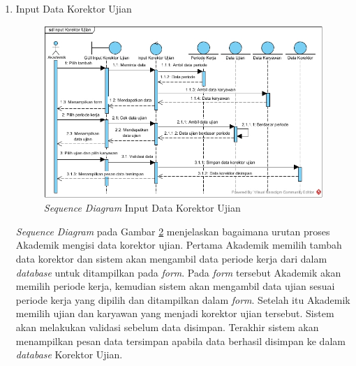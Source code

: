 \begin{enumerate}
\begin{enumerate}[label=\alph*.]
\begin{figure}[H]
            		    \caption{\emph{Sequence Diagram} Input Data Pengawas Ujian}
            		    \label{sequence_input_pengawas}
            		\end{figure}
            		\emph{Sequence Diagram} pada Gambar \ref{sequence_input_pengawas} menjelaskan bagaimana urutan proses Akademik mengisi data pengawas ujian. Pertama Akademik memilih tambah data pengawas dan sistem akan mengambil data periode kerja dari dalam \emph{database} untuk ditampilkan pada \emph{form}. Pada \emph{form} tersebut Akademik akan memilih periode kerja, kemudian sistem akan mengambil data ujian sesuai periode kerja yang dipilih dan ditampilkan dalam \emph{form}. Setelah itu Akademik memilih ujian dan karyawan yang menjadi pengawas ujian tersebut. Sistem akan melakukan validasi sebelum data disimpan. Terakhir sistem akan menampilkan pesan data tersimpan apabila data berhasil disimpan ke dalam \emph{database} Pengawas Ujian. \newpage
            	    \item Input Data Korektor Ujian
            	    \begin{figure}[H]
            		    \centering
            		    \includegraphics[width=14cm]{gambar/sequence/input-data-korektor}
            		    \caption{\emph{Sequence Diagram} Input Data Korektor Ujian}
            		    \label{sequence_input_korektor}
            		\end{figure}
            		\emph{Sequence Diagram} pada Gambar \ref{sequence_input_korektor} menjelaskan bagaimana urutan proses Akademik mengisi data korektor ujian. Pertama Akademik memilih tambah data korektor dan sistem akan mengambil data periode kerja dari dalam \emph{database} untuk ditampilkan pada \emph{form}. Pada \emph{form} tersebut Akademik akan memilih periode kerja, kemudian sistem akan mengambil data ujian sesuai periode kerja yang dipilih dan ditampilkan dalam \emph{form}. Setelah itu Akademik memilih ujian dan karyawan yang menjadi korektor ujian tersebut. Sistem akan melakukan validasi sebelum data disimpan. Terakhir sistem akan menampilkan pesan data tersimpan apabila data berhasil disimpan ke dalam \emph{database} Korektor Ujian. \newpage

\end{enumerate}
\end{enumerate}
